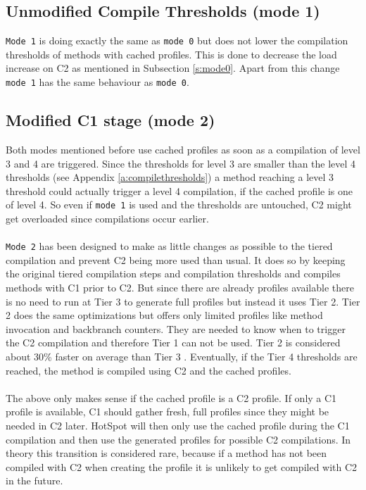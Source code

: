 \subsection{Unmodified Compile Thresholds (mode 1)}
\label{s:mode1}
\texttt{Mode 1} is doing exactly the same as \texttt{mode 0} but does not lower the compilation thresholds of methods with cached profiles.
This is done to decrease the load increase on C2 as mentioned in Subsection \ref{s:mode0}.
Apart from this change \texttt{mode 1} has the same behaviour as \texttt{mode 0}.
\subsection{Modified C1 stage (mode 2)}
\label{s:mode2}
Both modes mentioned before use cached profiles as soon as a compilation of level 3 and 4 are triggered. Since the thresholds for level 3 are smaller than the level 4 thresholds (see Appendix \ref{a:compilethresholds}) a method reaching a level 3 threshold could actually trigger a level 4 compilation, if the cached profile is one of level 4. So even if \texttt{mode 1} is used and the thresholds are untouched, C2 might get overloaded since compilations occur earlier.
\\\\
\texttt{Mode 2} has been designed to make as little changes as possible to the tiered compilation and prevent C2 being more used than usual. It does so by keeping the original tiered compilation steps and compilation thresholds and compiles methods with C1 prior to C2. But since there are already profiles available there is no need to run at Tier 3 to generate full profiles but instead it uses Tier 2.
Tier 2 does the same optimizations but offers only limited profiles like method invocation and backbranch counters. They are needed to know when to trigger the C2 compilation and therefore Tier 1 can not be used. Tier 2 is considered about 30\% faster on average than Tier 3 \cite{code_atp_hpp}.
Eventually, if the Tier 4 thresholds are reached, the method is compiled using C2 and the cached profiles.
\\\\
The above only makes sense if the cached profile is a C2 profile.
If only a C1 profile is available, C1 should gather fresh, full profiles since they might be needed in C2 later. HotSpot will then only use the cached profile during the C1 compilation and then use the generated profiles for possible C2 compilations.
In theory this transition is considered rare, because if a method has not been compiled with C2 when creating the profile it is unlikely to get compiled with C2 in the future.


